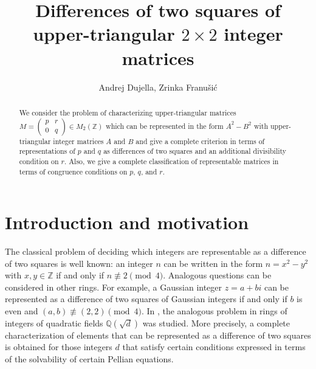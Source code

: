 \documentclass[11pt]{amsart}
\def\Q{\mathbb{Q}}
\begin{document}
\title[Differences of squares of upper-triangular  matrices]{Differences of two  squares of upper-triangular $2\times 2$ integer matrices}
\author[Andrej Dujella, Zrinka Franu\v{s}i\'{c}]{Andrej Dujella, Zrinka Franu\v{s}i\'{c}}


\address{
Department of Mathematics\\
Faculty of Science\\
University of Zagreb\\
Bijeni{\v c}ka cesta 30, 10000 Zagreb, Croatia}







\begin{abstract}
We consider the problem of characterizing upper-triangular matrices
$M=\begin{pmatrix}p&r\\0&q\end{pmatrix}\in M_2(\mathbb Z)$
which can be represented in the form $A^2-B^2$ with upper-triangular integer matrices $A$ and $B$ and  give a complete criterion in terms of representations of $p$ and $q$ as differences of two squares and an additional divisibility condition on $r$. Also, we give a complete classification of representable matrices in terms of congruence conditions on $p$, $q$, and $r$.
\end{abstract}

\maketitle

\section{Introduction and motivation}

The classical problem of deciding which integers are representable as a difference of two squares is well known: an integer $n$ can be written in the form $n=x^2-y^2$ with $x,y\in\mathbb Z$ if and only if $n\not\equiv 2\pmod 4$.  Analogous questions can be considered in other rings. For example, a Gaussian integer $z=a+bi$ can be represented as a difference of two squares of Gaussian integers if and only if $b$ is even and $(a,b)\not\equiv(2,2)\pmod4$. In \cite{duje-fra}, the analogous problem in rings of integers of quadratic fields $\Q(\sqrt d)$ was studied. More precisely, a complete characterization of  elements that  can be represented as a difference of two squares  is obtained for those integers $d$ that satisfy certain conditions expressed in terms of the solvability  of certain Pellian equations. 
\end{document}
